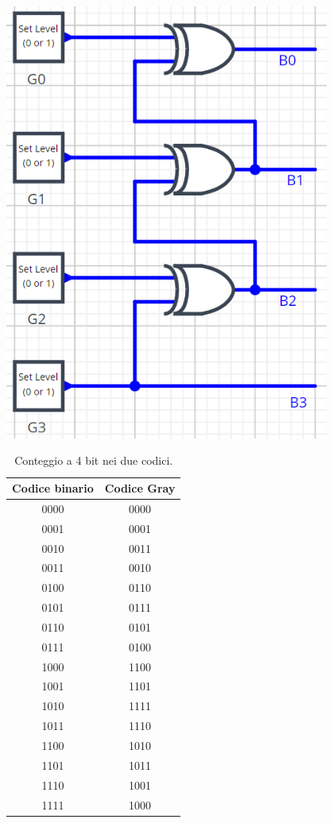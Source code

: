 \documentclass[10pt, a4paper, italian]{article}
\begin{document}
\begin{minipage}{0.5\textwidth}
    \centering
    \includegraphics[width=0.8\textwidth]{gb.png}
    
\end{minipage}

\begin{table}[htbp]
    \centering
    \begin{tabular}{c||c}
        Codice binario & Codice Gray \\
        \hline
        \hline
        0000 & 0000\\
        0001 & 0001\\
        0010 & 0011\\
        0011 & 0010\\
        0100 & 0110\\
        0101 & 0111\\
        0110 & 0101\\
        0111 & 0100\\
        1000 & 1100\\
        1001 & 1101\\
        1010 & 1111\\
        1011 & 1110\\
        1100 & 1010\\
        1101 & 1011\\
        1110 & 1001\\
        1111 & 1000\\
        \end{tabular}
    \caption{Conteggio a 4 bit nei due codici.}
    \label{tab: grbin}
\end{table}
\end{document}
